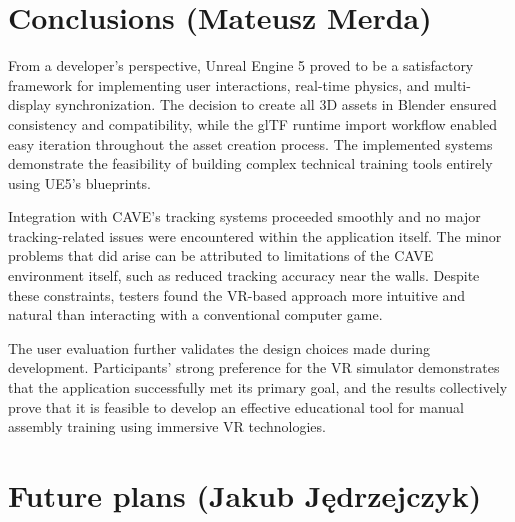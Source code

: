 \section{Conclusions (Mateusz Merda)}
\label{sec:conclusions}

From a developer's perspective, Unreal Engine 5 proved to be a satisfactory framework for implementing user interactions, real-time physics, and multi-display synchronization. The decision to create all 3D assets in Blender ensured consistency and compatibility, while the glTF runtime import workflow enabled easy iteration throughout the asset creation process. The implemented systems demonstrate the feasibility of building complex technical training tools entirely using UE5's blueprints.

Integration with CAVE's tracking systems proceeded smoothly and no major tracking-related issues were encountered within the application itself. The minor problems that did arise can be attributed to limitations of the CAVE environment itself, such as reduced tracking accuracy near the walls. Despite these constraints, testers found the VR-based approach more intuitive and natural than interacting with a conventional computer game.

The user evaluation further validates the design choices made during development. Participants' strong preference for the VR simulator demonstrates that the application successfully met its primary goal, and the results collectively prove that it is feasible to develop an effective educational tool for manual assembly training using immersive VR technologies.

\section{Future plans (Jakub Jędrzejczyk)}
\label{sec:FuturePlans}











